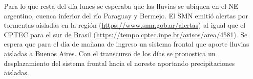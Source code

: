 Para lo que resta del día lunes se esperaba que las lluvias se ubiquen
en el NE argentino, cuenca inferior del río Paraguay y Bermejo. El SMN
emitió alertas por tormentas aisladas en la región
(\url{https://www.smn.gob.ar/alertas}) al igual que el CPTEC para el sur
de Brasil (\url{https://tempo.cptec.inpe.br/avisos/area/4581}). Se
espera que para el día de mañana de ingreso un sistema frontal que
aporte lluvias aisladas a Buenos Aires. Con el transcurso de los días se
pronostica un desplazamiento del sistema frontal hacia el noreste
aportando precipitaciones aisladas.
